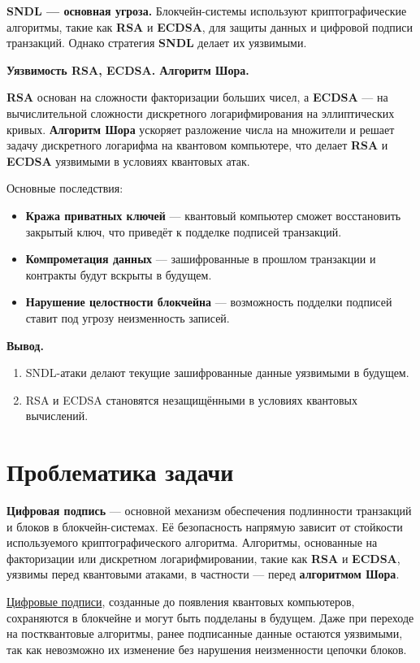 \documentclass[a4paper]{article}
\begin{document}
\noindent\textbf{SNDL — основная угроза.}  
Блокчейн-системы используют криптографические алгоритмы, такие как \textbf{RSA} и \textbf{ECDSA}, для защиты данных и цифровой подписи транзакций. Однако стратегия \textbf{SNDL} делает их уязвимыми.

\noindent\textbf{Уязвимость RSA, ECDSA. Алгоритм Шора.}  

\textbf{RSA} основан на сложности факторизации больших чисел, а \textbf{ECDSA} — на вычислительной сложности дискретного логарифмирования на эллиптических кривых. 
\textbf{Алгоритм Шора} ускоряет разложение числа на множители и решает задачу дискретного логарифма на квантовом компьютере, что делает \textbf{RSA} и \textbf{ECDSA} уязвимыми в условиях квантовых атак.

Основные последствия:
\begin{itemize}
    \item \textbf{Кража приватных ключей} — квантовый компьютер сможет восстановить закрытый ключ, что приведёт к подделке подписей транзакций.
    \item \textbf{Компрометация данных} — зашифрованные в прошлом транзакции и контракты будут вскрыты в будущем.
    \item \textbf{Нарушение целостности блокчейна} — возможность подделки подписей ставит под угрозу неизменность записей.
\end{itemize}

\noindent\textbf{Вывод.}  
\begin{enumerate}
    \item SNDL-атаки делают текущие зашифрованные данные уязвимыми в будущем.
    \item RSA и ECDSA становятся незащищёнными в условиях квантовых вычислений.
\end{enumerate}

\section{Проблематика задачи}

\textbf{Цифровая подпись} — основной механизм обеспечения подлинности транзакций и блоков в блокчейн-системах. Её безопасность напрямую зависит от стойкости используемого криптографического алгоритма. Алгоритмы, основанные на факторизации или дискретном логарифмировании, такие как \textbf{RSA} и \textbf{ECDSA}, уязвимы перед квантовыми атаками, в частности — перед \textbf{алгоритмом Шора}.

\underline{Цифровые подписи}, созданные до появления квантовых компьютеров, сохраняются в блокчейне и могут быть подделаны в будущем. Даже при переходе на постквантовые алгоритмы, ранее подписанные данные остаются уязвимыми, так как невозможно их изменение без нарушения неизменности цепочки блоков.
\end{document}
